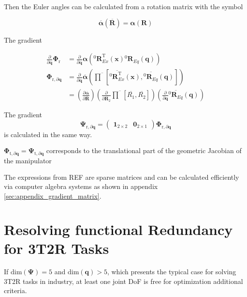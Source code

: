 \documentclass[twocolumn,10pt]{IFTOMM}
\newcommand{\bm}[1]{\boldsymbol{#1}}
\newcommand{\rotmat}[2]{{{ }^{#1}\boldsymbol{R}}_{#2}}
\newcommand{\transp}[0]{{\mathrm{T}}}
\begin{document}
Then the Euler angles can be calculated from a rotation matrix with the symbol

\begin{equation}
\overline{\bm{\alpha}}(\overline{\bm{R}})
=
\bm{\alpha}(\bm{R})
\end{equation}

The gradient


\begin{align}
\frac{\partial}{\partial \bm{q}}\bm{\Phi}_{\mathrm{r}}
&=
\frac{\partial}{\partial \bm{q}} \bm{\alpha}\left(\rotmat{0}{Ex}^\transp(\bm{x}) \rotmat{0}{Eq}(\bm{q})\right) \label{equ:grad_Phi_q}\\
\bm{\Phi}_{\mathrm{r},\partial\bm{q}}
&=
\frac{\partial}{\partial \bm{q}} \overline{\bm{\alpha}}\left(\overline{\prod}\left[ \overline{\rotmat{0}{Ex}^\transp}(\bm{x}), \overline{\rotmat{0}{Eq}}(\bm{q})\right]\right) \nonumber \\
&=
\left(\frac{\partial \overline{\bm{\alpha}}}{\partial \overline{\bm{R}}}\right)
\left(\frac{\partial }{\partial \overline{\bm{R}_2}}
\overline{\prod}\left[ \overline{R_1}, \overline{R_2}\right]\right)
\left(\frac{\partial}{\partial \bm{q}} \overline{\rotmat{0}{Eq}}(\bm{q})\right)  \nonumber
\end{align}

The gradient
\begin{equation}
\bm{\Psi}_{\mathrm{r},\partial\bm{q}}
=
\begin{pmatrix} \bm{1}_{2 \times 2} & \bm{0}_{2 \times 1}\end{pmatrix} \bm{\Phi}_{\mathrm{r},\partial\bm{q}}
\end{equation}
is calculated in the same way.

$\bm{\Phi}_{\mathrm{t},\partial\bm{q}}=\bm{\Psi}_{\mathrm{t},\partial\bm{q}}$ corresponds to the translational part of the geometric Jacobian of the manipulator

The expressions from REF are sparse matrices and can be calculated efficiently via computer algebra systems as shown in appendix \ref{sec:appendix_gradient_matrix}.


\section{Resolving functional Redundancy for 3T2R Tasks}
\label{sec:ResFuncRed}


If $\mathrm{dim}(\bm{\Psi})=5$ and $\mathrm{dim}(\bm{q})>5$, which presents the typical case for solving 3T2R tasks in industry, at least one joint DoF is free for optimization additional criteria.
\end{document}
